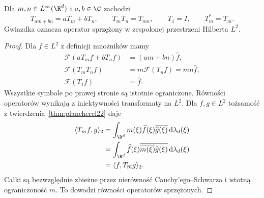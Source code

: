 \begin{wniosek}
Dla $m,n\in L^\infty(\R^d)$ i $a,b\in\C$ zachodzi
\[
 T_{am+bn}=aT_m+bT_n,\qquad
 T_mT_n=T_{mn},\qquad T_1=I,\qquad
 T_m^*=T_{\overline m}.
\]
Gwiazdka oznacza operator sprzężony w zespolonej
przestrzeni Hilberta $L^2$.
\end{wniosek}
\begin{proof}
Dla $f\in L^2$ z definicji mnożników mamy
\[
 \begin{aligned}
 \mathcal F(aT_mf+bT_nf)&=(am+bn)\widehat f,\\
 \mathcal F(T_mT_nf)&=m\mathcal F(T_nf)=mn\widehat f,\\
 \mathcal F(T_1f)&=\widehat f.
 \end{aligned}
\]
Wszystkie symbole po prawej stronie są istotnie
ograniczone. Równości operatorów wynikają
z iniektywności transformaty na $L^2$.
Dla $f,g\in L^2$ tożsamość
 z twierdzenia~\ref{thm:plancherel22} daje
\[
 \begin{aligned}
 \langle T_m f,g\rangle_2
 &=\int_{\R^d}m(\xi)\widehat f(\xi)
       \overline{\widehat g(\xi)}\,\mathrm d\lambda_d(\xi)\\
 &=\int_{\R^d}\widehat f(\xi)
       \overline{\overline{m(\xi)}\widehat g(\xi)}
       \,\mathrm d\lambda_d(\xi)\\
 &=\langle f,T_{\overline m}g\rangle_2.
 \end{aligned}
\]
Całki są bezwzględnie zbieżne przez nierówność
Cauchy'ego--Schwarza i istotną ograniczoność $m$.
To dowodzi równości operatorów sprzężonych.
\end{proof}

